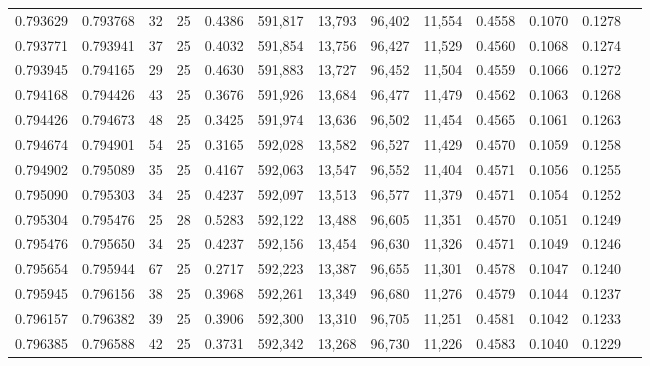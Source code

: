 \begin{tabular}{rrrrrrrrrrrrr}
0.793629 & 0.793768 &    32 &  25 &                                     0.4386 & 591,817 &  13,793 &  96,402 &  11,554 & 0.4558 & 0.1070 & 0.1278 \\
0.793771 & 0.793941 &    37 &  25 &                                     0.4032 & 591,854 &  13,756 &  96,427 &  11,529 & 0.4560 & 0.1068 & 0.1274 \\
0.793945 & 0.794165 &    29 &  25 &                                     0.4630 & 591,883 &  13,727 &  96,452 &  11,504 & 0.4559 & 0.1066 & 0.1272 \\
0.794168 & 0.794426 &    43 &  25 &                                     0.3676 & 591,926 &  13,684 &  96,477 &  11,479 & 0.4562 & 0.1063 & 0.1268 \\
0.794426 & 0.794673 &    48 &  25 &                                     0.3425 & 591,974 &  13,636 &  96,502 &  11,454 & 0.4565 & 0.1061 & 0.1263 \\
0.794674 & 0.794901 &    54 &  25 &                                     0.3165 & 592,028 &  13,582 &  96,527 &  11,429 & 0.4570 & 0.1059 & 0.1258 \\
0.794902 & 0.795089 &    35 &  25 &                                     0.4167 & 592,063 &  13,547 &  96,552 &  11,404 & 0.4571 & 0.1056 & 0.1255 \\
0.795090 & 0.795303 &    34 &  25 &                                     0.4237 & 592,097 &  13,513 &  96,577 &  11,379 & 0.4571 & 0.1054 & 0.1252 \\
0.795304 & 0.795476 &    25 &  28 &                                     0.5283 & 592,122 &  13,488 &  96,605 &  11,351 & 0.4570 & 0.1051 & 0.1249 \\
0.795476 & 0.795650 &    34 &  25 &                                     0.4237 & 592,156 &  13,454 &  96,630 &  11,326 & 0.4571 & 0.1049 & 0.1246 \\
0.795654 & 0.795944 &    67 &  25 &                                     0.2717 & 592,223 &  13,387 &  96,655 &  11,301 & 0.4578 & 0.1047 & 0.1240 \\
0.795945 & 0.796156 &    38 &  25 &                                     0.3968 & 592,261 &  13,349 &  96,680 &  11,276 & 0.4579 & 0.1044 & 0.1237 \\
0.796157 & 0.796382 &    39 &  25 &                                     0.3906 & 592,300 &  13,310 &  96,705 &  11,251 & 0.4581 & 0.1042 & 0.1233 \\
0.796385 & 0.796588 &    42 &  25 &                                     0.3731 & 592,342 &  13,268 &  96,730 &  11,226 & 0.4583 & 0.1040 & 0.1229 \\

\end{tabular}
